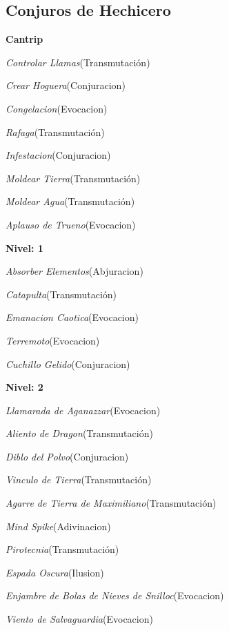 \documentclass[a4paper,twocolumn,openany,10pt]{dndbook}
\begin{document}
\subsection*{Conjuros de Hechicero}
\begin{list}{}{}
	\item \textbf{Cantrip}
	\begin{list}{}{}
		\item \textit{Controlar Llamas}(Transmutación)
		\item \textit{Crear Hoguera}(Conjuracion)
		\item \textit{Congelacion}(Evocacion)
		\item \textit{Rafaga}(Transmutación)
		\item \textit{Infestacion}(Conjuracion)
		\item \textit{Moldear Tierra}(Transmutación)
		\item \textit{Moldear Agua}(Transmutación)
		\item \textit{Aplauso de Trueno}(Evocacion)
	\end{list}

	\item \textbf{Nivel: 1}
	\begin{list}{}{}
		\item \textit{Absorber Elementos}(Abjuracion)
		\item \textit{Catapulta}(Transmutación)
		\item \textit{Emanacion Caotica}(Evocacion)
		\item \textit{Terremoto}(Evocacion)
		\item \textit{Cuchillo Gelido}(Conjuracion)
	\end{list}

	\item \textbf{Nivel: 2}
	\begin{list}{}{}
		\item \textit{Llamarada de Aganazzar}(Evocacion)
		\item \textit{Aliento de Dragon}(Transmutación)
		\item \textit{Diblo del Polvo}(Conjuracion)
		\item \textit{Vinculo de Tierra}(Transmutación)
		\item \textit{Agarre de Tierra de Maximiliano}(Transmutación)
		\item \textit{Mind Spike}(Adivinacion)
		\item \textit{Pirotecnia}(Transmutación)
		\item \textit{Espada Oscura}(Ilusion)
		\item \textit{Enjambre de Bolas de Nieves de Snilloc}(Evocacion)
		\item \textit{Viento de Salvaguardia}(Evocacion)
	\end{list}


\end{list}
\end{document}
